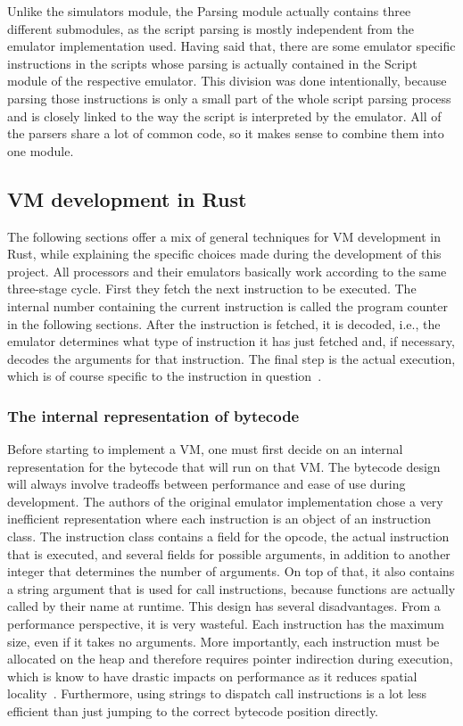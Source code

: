 Unlike the simulators module, the Parsing module actually contains three different submodules, as the script parsing is mostly independent from the emulator implementation used.
Having said that, there are some emulator specific instructions in the scripts whose parsing is actually contained in the Script module of the respective emulator. This division was done intentionally, because parsing those instructions is only a small part of the whole script parsing process and is closely linked to the way the script is interpreted by the emulator.
All of the parsers share a lot of common code, so it makes sense to combine them into one module.

\subsection{VM development in Rust} \label{rust-vm-dev}
The following sections offer a mix of general techniques for VM development in Rust, while explaining the specific choices made during the development of this project.
All processors and their emulators basically work according to the same three-stage cycle. First they fetch the next instruction to be executed. The internal number containing the current instruction is called the program counter in the following sections.
After the instruction is fetched, it is decoded, i.e., the emulator determines what type of instruction it has just fetched and, if necessary, decodes the arguments for that instruction.
The final step is the actual execution, which is of course specific to the instruction in question~\cite{nystrom2021crafting}.

\subsubsection{The internal representation of bytecode}
Before starting to implement a VM, one must first decide on an internal representation for the bytecode that will run on that VM.
The bytecode design will always involve tradeoffs between performance and ease of use during development.
The authors of the original emulator implementation chose a very inefficient representation where each instruction is an object of an instruction class. The instruction class contains a field for the opcode, the actual instruction that is executed, and several fields for possible arguments, in addition to another integer that determines the number of arguments.
On top of that, it also contains a string argument that is used for call instructions, because functions are actually called by their name at runtime.
This design has several disadvantages. From a performance perspective, it is very wasteful. Each instruction has the maximum size, even if it takes no arguments. More importantly, each instruction must be allocated on the heap and therefore requires pointer indirection during execution, which is know to have drastic impacts on performance as it reduces spatial locality~\cite{6498541}.
Furthermore, using strings to dispatch call instructions is a lot less efficient than just jumping to the correct bytecode position directly.

